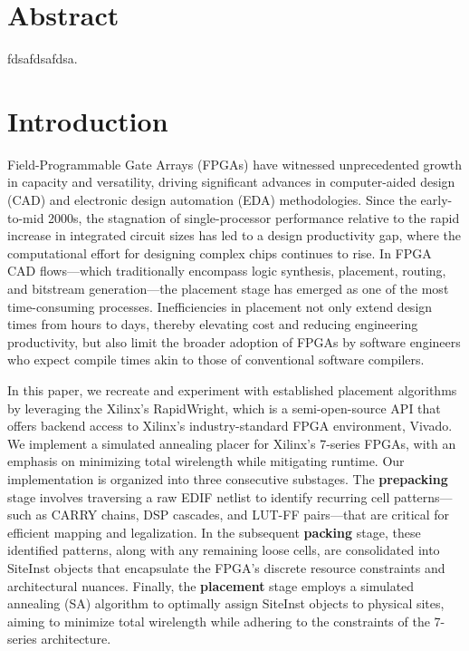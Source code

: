 \documentclass{article}
\begin{document}
\begin{multicols}{2}
\section{Abstract}
    fdsafdsafdsa.

\section{Introduction}

    Field-Programmable Gate Arrays (FPGAs) have witnessed unprecedented growth in capacity and versatility, driving significant advances in computer-aided design (CAD) and electronic design automation (EDA) methodologies. 
    Since the early-to-mid 2000s, the stagnation of single-processor performance relative to the rapid increase in integrated circuit sizes has led to a design productivity gap, where the computational effort for designing complex chips continues to rise. 
    In FPGA CAD flows—which traditionally encompass logic synthesis, placement, routing, and bitstream generation—the placement stage has emerged as one of the most time-consuming processes. 
    Inefficiencies in placement not only extend design times from hours to days, thereby elevating cost and reducing engineering productivity, but also limit the broader adoption of FPGAs by software engineers who expect compile times akin to those of conventional software compilers. 

    In this paper, we recreate and experiment with established placement algorithms by leveraging the Xilinx's RapidWright, which is a semi-open-source API that offers backend access to Xilinx's industry-standard FPGA environment, Vivado. We implement a simulated annealing placer for Xilinx's 7-series FPGAs, with an emphasis on minimizing total wirelength while mitigating runtime. Our implementation is organized into three consecutive substages. The \textbf{prepacking} stage involves traversing a raw EDIF netlist to identify recurring cell patterns—such as CARRY chains, DSP cascades, and LUT-FF pairs—that are critical for efficient mapping and legalization. In the subsequent \textbf{packing} stage, these identified patterns, along with any remaining loose cells, are consolidated into SiteInst objects that encapsulate the FPGA’s discrete resource constraints and architectural nuances. Finally, the \textbf{placement} stage employs a simulated annealing (SA) algorithm to optimally assign SiteInst objects to physical sites, aiming to minimize total wirelength while adhering to the constraints of the 7-series architecture.


\end{multicols}
\end{document}
